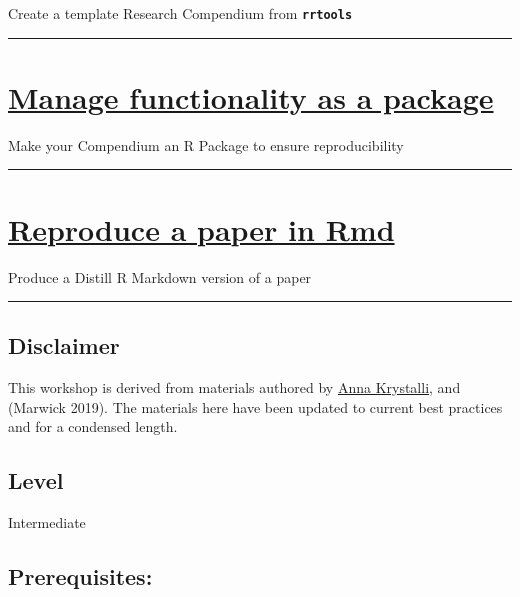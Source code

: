 \documentclass[
  letterpaper,
  DIV=11,
  numbers=noendperiod]{scrreprt}
\begin{document}
Create a template Research Compendium from \textbf{\texttt{rrtools}}

\begin{center}\rule{0.5\linewidth}{0.5pt}\end{center}

\hypertarget{manage-functionality-as-a-package}{%
\section{\texorpdfstring{\href{https://annakrystalli.me/rrtools-repro-research/package.html}{\textbf{Manage
functionality as a
package}}}{Manage functionality as a package}}\label{manage-functionality-as-a-package}}

Make your Compendium an R Package to ensure reproducibility

\begin{center}\rule{0.5\linewidth}{0.5pt}\end{center}

\hypertarget{reproduce-a-paper-in-rmd}{%
\section{\texorpdfstring{\href{https://annakrystalli.me/rrtools-repro-research/paper.html}{\textbf{Reproduce
a paper in
Rmd}}}{Reproduce a paper in Rmd}}\label{reproduce-a-paper-in-rmd}}

Produce a Distill R Markdown version of a paper

\begin{center}\rule{0.5\linewidth}{0.5pt}\end{center}

\hypertarget{disclaimer}{%
\subsection{Disclaimer}\label{disclaimer}}

This workshop is derived from materials authored by
\href{https://github.com/annakrystalli/rrtools-repro-research}{Anna
Krystalli}, and (Marwick 2019). The materials here have been updated to
current best practices and for a condensed length.

\hypertarget{level}{%
\subsection{Level}\label{level}}

Intermediate

\hypertarget{prerequisites}{%
\subsection{Prerequisites:}\label{prerequisites}}
\end{document}
